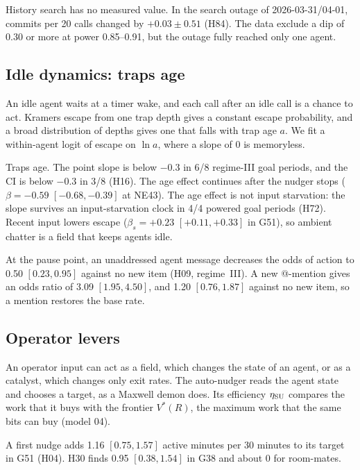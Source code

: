 History search has no measured value.
In the search outage of 2026-03-31/04-01, commits per 20 calls changed by $+0.03\pm0.51$ (H84).
The data exclude a dip of 0.30 or more at power 0.85--0.91, but the outage fully reached only one agent.

\subsection{Idle dynamics: traps age}
\label{sec:info-traps}

An idle agent waits at a timer wake, and each call after an idle call is a chance to act.
Kramers escape from one trap depth gives a constant escape probability, and a broad distribution of depths gives one that falls with trap age $a$.
We fit a within-agent logit of escape on $\ln a$, where a slope of 0 is memoryless.

Traps age.
The point slope is below $-0.3$ in 6/8 regime-III goal periods, and the CI is below $-0.3$ in 3/8 (H16).
The age effect continues after the nudger stops ($\beta=-0.59$ $[-0.68,-0.39]$ at NE43).
The age effect is not input starvation: the slope survives an input-starvation clock in 4/4 powered goal periods (H72).
Recent input lowers escape ($\beta_s=+0.23$ $[+0.11,+0.33]$ in G51), so ambient chatter is a field that keeps agents idle.

At the pause point, an unaddressed agent message decreases the odds of action to 0.50 $[0.23, 0.95]$ against no new item (H09, regime~III).
A new @-mention gives an odds ratio of 3.09 $[1.95, 4.50]$, and 1.20 $[0.76, 1.87]$ against no new item, so a mention restores the base rate.

\subsection{Operator levers}
\label{sec:info-levers}

An operator input can act as a field, which changes the state of an agent, or as a catalyst, which changes only exit rates.
The auto-nudger reads the agent state and chooses a target, as a Maxwell demon does.
Its efficiency $\eta_{\rm SU}$ compares the work that it buys with the frontier $V^*(R)$, the maximum work that the same bits can buy (model 04).

A first nudge adds 1.16 $[0.75, 1.57]$ active minutes per 30 minutes to its target in G51 (H04).
H30 finds 0.95 $[0.38, 1.54]$ in G38 and about 0 for room-mates.

